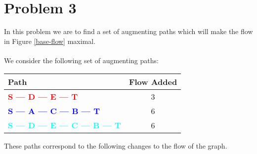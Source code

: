 \section*{Problem 3}

In this problem we are to find a set of augmenting paths which will 
make the flow in Figure \ref{base-flow} maximal. 
\\
\\
We consider the following set of augmenting paths:
\begin{center}
    \begin{tabular}{ l | c }
    \textbf{Path} & \textbf{Flow Added} \\
    \hline
    \textcolor{red}{\textbf{S --- D --- E --- T}} & 3 \\
    \textcolor{blue}{\textbf{S --- A --- C --- B --- T}} & 6 \\
    \textcolor{cyan}{\textbf{S --- D --- E --- C --- B --- T}} & 6 \\
    \end{tabular}
\end{center}
%
These paths correspond to the following changes to the flow of the
graph.
%
